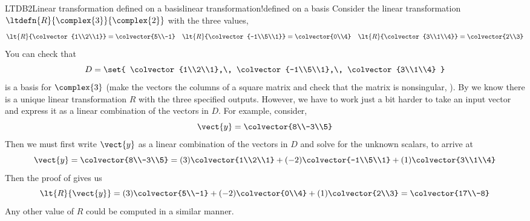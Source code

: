 \begin{example}{LTDB2}{Linear transformation defined on a basis}{linear transformation!defined on a basis}
Consider the linear transformation $\ltdefn{R}{\complex{3}}{\complex{2}}$ with the three values,
%
\begin{align*}
\lt{R}{\colvector{1\\2\\1}}=\colvector{5\\-1}&&
\lt{R}{\colvector{-1\\5\\1}}=\colvector{0\\4}&&
\lt{R}{\colvector{3\\1\\4}}=\colvector{2\\3}
\end{align*}
%
You can check that
%
\begin{equation*}
D=\set{
\colvector{1\\2\\1},\,
\colvector{-1\\5\\1},\,
\colvector{3\\1\\4}
}
\end{equation*}
%
is a basis for $\complex{3}$ (make the vectors the columns of a square matrix and check that the matrix is nonsingular,  ).  By  we know there is a unique linear transformation $R$ with the three specified outputs.  However, we have to work just a bit harder to take an input vector and express it as a linear combination of the vectors in $D$.  For example, consider,
%
\begin{equation*}
\vect{y}=\colvector{8\\-3\\5}
\end{equation*}
%
Then we must first write $\vect{y}$ as a linear combination of the vectors in $D$ and solve for the unknown scalars, to arrive at
%
\begin{equation*}
\vect{y}=\colvector{8\\-3\\5}= (3)\colvector{1\\2\\1}+ (-2)\colvector{-1\\5\\1}+ (1)\colvector{3\\1\\4}
\end{equation*}
%
Then the proof of  gives us
%
\begin{equation*}
\lt{R}{\vect{y}}=(3)\colvector{5\\-1}+ (-2)\colvector{0\\4}+ (1)\colvector{2\\3}= \colvector{17\\-8}
\end{equation*}
%
Any other value of $R$ could be computed in a similar manner.
%
\end{example}
